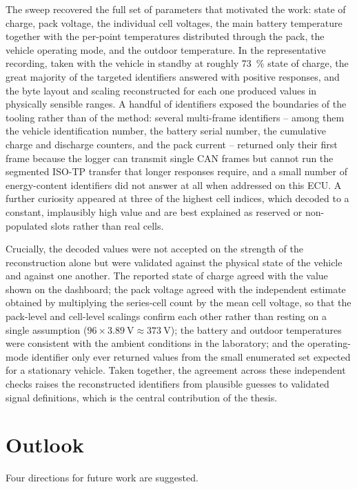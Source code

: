 \documentclass[11pt,a4paper,oneside,parskip=half]{scrreprt}
\begin{document}
The sweep recovered the full set of parameters that motivated the work: state of charge, pack voltage, the individual cell voltages, the main battery temperature together with the per-point temperatures distributed through the pack, the vehicle operating mode, and the outdoor temperature. In the representative recording, taken with the vehicle in standby at roughly 73~\% state of charge, the great majority of the targeted identifiers answered with positive responses, and the byte layout and scaling reconstructed for each one produced values in physically sensible ranges. A handful of identifiers exposed the boundaries of the tooling rather than of the method: several multi-frame identifiers -- among them the vehicle identification number, the battery serial number, the cumulative charge and discharge counters, and the pack current -- returned only their first frame because the logger can transmit single CAN frames but cannot run the segmented ISO-TP transfer that longer responses require, and a small number of energy-content identifiers did not answer at all when addressed on this ECU. A further curiosity appeared at three of the highest cell indices, which decoded to a constant, implausibly high value and are best explained as reserved or non-populated slots rather than real cells.

Crucially, the decoded values were not accepted on the strength of the reconstruction alone but were validated against the physical state of the vehicle and against one another. The reported state of charge agreed with the value shown on the dashboard; the pack voltage agreed with the independent estimate obtained by multiplying the series-cell count by the mean cell voltage, so that the pack-level and cell-level scalings confirm each other rather than resting on a single assumption ($96 \times 3.89~\text{V} \approx 373~\text{V}$); the battery and outdoor temperatures were consistent with the ambient conditions in the laboratory; and the operating-mode identifier only ever returned values from the small enumerated set expected for a stationary vehicle. Taken together, the agreement across these independent checks raises the reconstructed identifiers from plausible guesses to validated signal definitions, which is the central contribution of the thesis.

\section{Outlook}
Four directions for future work are suggested.
\end{document}
